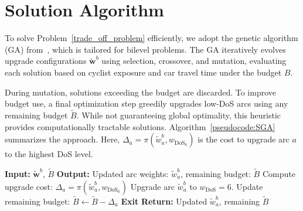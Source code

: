 \documentclass[letterpaper, 10 pt, conference]{ieeeconf}  %
\begin{document}
\section{Solution Algorithm}
\label{solution_algorithm}

To solve Problem~\ref{trade_off_problem} efficiently, we adopt the genetic algorithm (GA) from~\cite{jurado2025improving}, which is tailored for bilevel problems. The GA iteratively evolves upgrade configurations $\tilde{\mathbf{w}}^{b}$ using selection, crossover, and mutation, evaluating each solution based on cyclist exposure and car travel time under the budget $B$.

During mutation, solutions exceeding the budget are discarded. To improve budget use, a final optimization step greedily upgrades low-DoS arcs using any remaining budget $\tilde{B}$. While not guaranteeing global optimality, this heuristic provides computationally tractable solutions. Algorithm~\ref{pseudocode:SGA} summarizes the approach. Here, $\Delta_a = \pi(\tilde{w}_a^{b}, w_{\text{DoS}_6})$ is the cost to upgrade arc $a$ to the highest DoS level.

\begin{algorithm}[H]
\caption{GA}
\label{pseudocode:SGA}
\footnotesize
\begin{algorithmic}[1]
\State \textbf{Input:}  $\tilde{\mathbf{w}}^{b}$, $\tilde{B}$
\State \textbf{Output:} Updated arc weights: $\tilde{w}_{a}^{b}$, remaining budget: $\tilde{B}$
    \State Compute upgrade cost: $\Delta_a = \pi(\tilde{w}_a^{b}, w_{\text{DoS}_6})$
        \State Upgrade arc $\tilde{w}_{a}^{b}$ to $w_{\text{DoS}} = 6$.
        \State Update remaining budget: $\tilde{B} \gets \tilde{B} - \Delta_a$
    \EndIf
        \State \textbf{Exit}
    \EndIf
\EndFor
\State \textbf{Return:} Updated $\tilde{w}_a^{b}$, remaining $\tilde{B}$
\end{algorithmic}
\end{algorithm}
\end{document}
